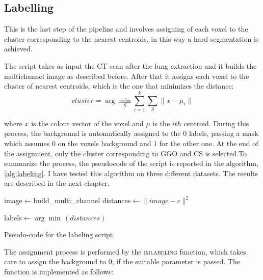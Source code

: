 
	
	\subsection{Labelling}
	
	
	
 
	This is the last step of the pipeline and involves assigning of each voxel to the cluster corresponding to the nearest centroids, in this way a hard segmentation is achieved.

	The script takes as input the CT scan after the lung extraction and it builds the multichannel image as described before. After that it assigns each voxel to the cluster of nearest centroids, which is the one that minimizes the distance: 
	\begin{equation}
		cluster = \arg\min_{S}  \sum_{i=1}^k \sum_{S} \| x - \mu_i\|
	\end{equation}
	
	where $x$ is the colour vector of the voxel and $\mu$ is the $ith$ centroid. During this process, the background is automatically assigned to the 0 labels, passing a mask which assumes $0$ on the voxels background and $1$ for the other one. At the end of the assignment, only the cluster corresponding to GGO and CS is selected.To summarize the process, the pseudocode of the script is reported in the algorithm,\ref{alg:labeling}.
	I have tested this algorithm on three different datasets. The results are described in the next chapter.
	\begin{algorithm}
		
		\SetAlgoLined
		\DontPrintSemicolon
		
		
		
		image$\leftarrow$build\_multi\_channel\;
		{
			distances$\leftarrow\| image - c\|^2$\;
		}
		
		labels$\leftarrow\arg\min\,(distances)$\;
		
		\caption{Pseudo-code for the labeling script}\label{alg:labeling}
		
	\end{algorithm}
	

 	The assignment process is performed by the \textsc{imlabeling} function, which takes care to assign the background to $0$, if the suitable parameter is passed. The function is implemented as follows:

